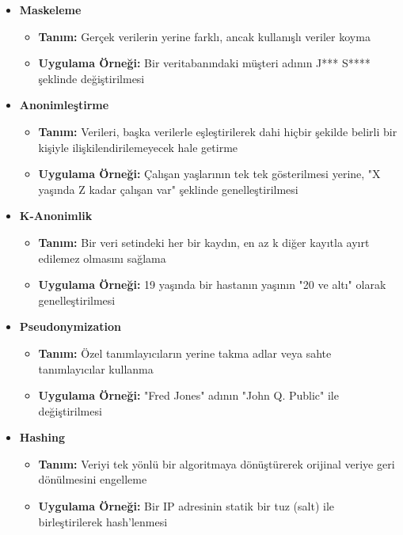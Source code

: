 \begin{itemize}
    \item \textbf{Maskeleme}
    \begin{itemize}
        \item \textbf{Tanım:} Gerçek verilerin yerine farklı, ancak kullanışlı veriler koyma
        \item \textbf{Uygulama Örneği:} Bir veritabanındaki müşteri adının J*** S**** şeklinde değiştirilmesi
    \end{itemize}
    
    \item \textbf{Anonimleştirme}
    \begin{itemize}
        \item \textbf{Tanım:} Verileri, başka verilerle eşleştirilerek dahi hiçbir şekilde belirli bir kişiyle ilişkilendirilemeyecek hale getirme
        \item \textbf{Uygulama Örneği:} Çalışan yaşlarının tek tek gösterilmesi yerine, "X yaşında Z kadar çalışan var" şeklinde genelleştirilmesi
    \end{itemize}
    
    \item \textbf{K-Anonimlik}
    \begin{itemize}
        \item \textbf{Tanım:} Bir veri setindeki her bir kaydın, en az k diğer kayıtla ayırt edilemez olmasını sağlama
        \item \textbf{Uygulama Örneği:} 19 yaşında bir hastanın yaşının "20 ve altı" olarak genelleştirilmesi
    \end{itemize}
    
    \item \textbf{Pseudonymization}
    \begin{itemize}
        \item \textbf{Tanım:} Özel tanımlayıcıların yerine takma adlar veya sahte tanımlayıcılar kullanma
        \item \textbf{Uygulama Örneği:} "Fred Jones" adının "John Q. Public" ile değiştirilmesi
    \end{itemize}
    
    \item \textbf{Hashing}
    \begin{itemize}
        \item \textbf{Tanım:} Veriyi tek yönlü bir algoritmaya dönüştürerek orijinal veriye geri dönülmesini engelleme
        \item \textbf{Uygulama Örneği:} Bir IP adresinin statik bir tuz (salt) ile birleştirilerek hash'lenmesi
    \end{itemize}
\end{itemize}